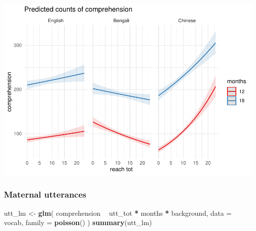 \documentclass[]{article}
\newenvironment{Shaded}{\begin{snugshade}}{\end{snugshade}}
\newcommand{\DataTypeTok}[1]{\textcolor[rgb]{0.13,0.29,0.53}{#1}}
\newcommand{\KeywordTok}[1]{\textcolor[rgb]{0.13,0.29,0.53}{\textbf{#1}}}
\newcommand{\NormalTok}[1]{#1}
\newcommand{\OperatorTok}[1]{\textcolor[rgb]{0.81,0.36,0.00}{\textbf{#1}}}
\newcommand{\StringTok}[1]{\textcolor[rgb]{0.31,0.60,0.02}{#1}}
\begin{document}
\includegraphics{supplement_files/figure-latex/reach-lm-2-plot-1.pdf}

\hypertarget{maternal-utterances}{%
\subsubsection{Maternal utterances}\label{maternal-utterances}}

\begin{Shaded}
\begin{Highlighting}[]
\NormalTok{utt_lm <-}\StringTok{ }\KeywordTok{glm}\NormalTok{(}
\NormalTok{  comprehension }\OperatorTok{~}
\StringTok{    }\NormalTok{utt_tot }\OperatorTok{*}
\StringTok{    }\NormalTok{months }\OperatorTok{*}
\StringTok{    }\NormalTok{background,}
  \DataTypeTok{data =}\NormalTok{ vocab,}
  \DataTypeTok{family =} \KeywordTok{poisson}\NormalTok{()}
\NormalTok{)}
\KeywordTok{summary}\NormalTok{(utt_lm)}
\end{Highlighting}
\end{Shaded}
\end{document}
